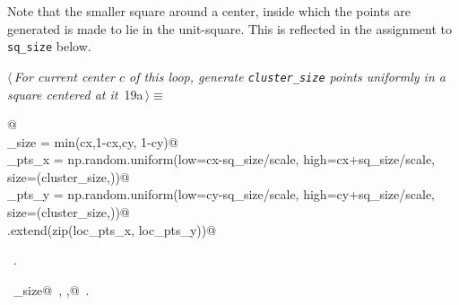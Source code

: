 \documentclass[11.5pt]{report}
\begin{document}
\vspace{-0.8cm} \newchunk Note that the smaller square around a center, inside which the points are generated is made to lie 
in the unit-square. This is reflected in the assignment to \verb|sq_size| below. 
\begin{flushleft} \small
\begin{minipage}{\linewidth}\label{scrap19}\raggedright\small
{} $\langle\,${\itshape For current center $c$ of this loop, generate \verb|cluster_size| points uniformly in a square centered at it}\nobreak\ {\footnotesize {19a}}$\,\rangle\equiv$
\vspace{-1ex}
\begin{list}{}{} \item
\mbox{}\verb@   @\\
\mbox{}\verb@sq_size      = min(cx,1-cx,cy, 1-cy)@\\
\mbox{}\verb@loc_pts_x    = np.random.uniform(low=cx-sq_size/scale, high=cx+sq_size/scale, size=(cluster_size,))@\\
\mbox{}\verb@loc_pts_y    = np.random.uniform(low=cy-sq_size/scale, high=cy+sq_size/scale, size=(cluster_size,))@\\
\mbox{}\verb@points.extend(zip(loc_pts_x, loc_pts_y))@\\
\mbox{}\verb@@{\NWsep}
\end{list}
\vspace{-1.5ex}
\footnotesize
\begin{list}{}{\setlength{\itemsep}{-\parsep}\setlength{\itemindent}{-\leftmargin}}
\item \NWtxtMacroRefIn\ .
\item \NWtxtIdentsUsed\nobreak\  \verb@cluster_size@\nobreak\ , \verb@scale,@\nobreak\ .
\item{}
\end{list}
\end{minipage}\vspace{4ex}
\end{flushleft}
\end{document}
